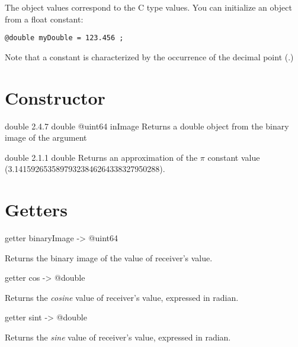 

The  object values correspond to the C type  values. You can initialize an  object from a float constant:

\texttt{@double myDouble = 123.456 ;}

Note that a  constant is characterized by the occurrence of the decimal point (.)

\section{Constructor}

{double}
{2.4.7}
{double}
{@uint64 inImage}
{Returns a double object from the binary image of the argument}
{}

{double}
{2.1.1}
{double}
{Returns an approximation of the $\pi$ constant value (3.14159265358979323846264338327950288).}
{}

\section{Getters}


\begin{galgascode}
getter binaryImage -> @uint64
\end{galgascode}

Returns the binary image of the value of receiver's value.





\begin{galgascode}
getter cos -> @double
\end{galgascode}

Returns the \emph{cosine} value of receiver's value, expressed in radian.





\begin{galgascode}
getter sint -> @double
\end{galgascode}

Returns the \emph{sine} value of receiver's value, expressed in radian.




